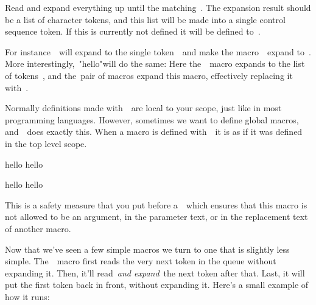 {{\stopsectionlevel

\startsectionlevel[title={\type{\csname}~and~\type{\endcsname}},reference={csname-and-endcsname}]

Read and expand everything up until the matching~\type{\endcsname}. The
expansion result should be a list of character tokens, and this list
will be made into a single control sequence token. If this is currently
not defined it will be defined to~\type{\relax}.

For instance~~will expand to the single
token~\type{\hello}~and make the macro~\type{\hello}~expand
to~\type{\relax}. More
interestingly,~\type"\def\inner{hello}\csname\inner\endcsname"will do
the same: Here the~~macro expands to the list of
tokens~, and the~pair of macros expand this
macro, effectively replacing it with~.

\stopsectionlevel

\startsectionlevel[title={\type{\gdef}},reference={gdef}]

Normally definitions made with~\type{\def}~are local to your scope, just
like in most programming languages. However, sometimes we want to define
global macros, and~~does exactly this. When a macro is
defined with~\type{\gdef}~it is as if it was defined in the top level
scope.

\starttyping
{
    \def\inner{hello}
    \inner  %
}
\inner   %

{
    \gdef\inner{hello}
    \inner  %
}
\inner %
\stoptyping

\stopsectionlevel

\startsectionlevel[title={\type{\outer}},reference={outer}]

This is a safety measure that you put before a~\type{\def}~which ensures
that this macro is not allowed to be an argument, in the parameter text,
or in the replacement text of another macro.

\stopsectionlevel

\stopsectionlevel

\startsectionlevel[title={The~\type{\expandafter}~Macro},reference={the-expandafter-macro}]

Now that we've seen a few simple macros we turn to one that is slightly
less simple. The~\type{\expandafter}~macro first reads the very next
token in the queue without expanding it. Then, it'll read~{\em and
expand}~the next token after that. Last, it will put the first token
back in front, without expanding it. Here's a small example of how it
runs:

}}
